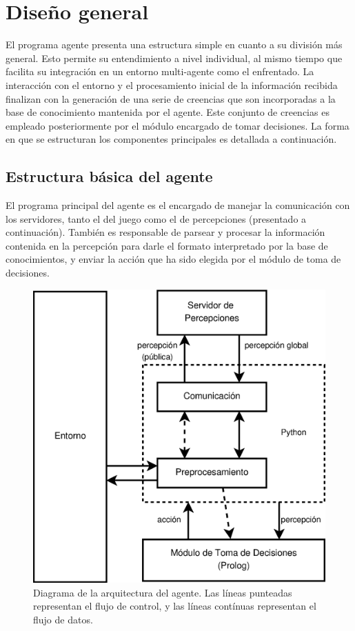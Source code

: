 \documentclass[oneside]{book}
\theoremstyle{definition}
\begin{document}
\section{Diseño general}

\label{sec:disenoGeneral}

El programa agente presenta una estructura simple en cuanto a su división más general. 
Esto permite su entendimiento a nivel individual, al mismo tiempo que facilita su 
integración en un entorno multi-agente como el enfrentado. La interacción con el entorno 
y el procesamiento inicial de la información recibida finalizan con la generación de una 
serie de creencias que son incorporadas a la base de conocimiento mantenida por el agente. 
Este conjunto de creencias es empleado posteriormente por el módulo encargado de tomar 
decisiones. La forma en que se estructuran los componentes principales es detallada a 
continuación.

\subsection{Estructura básica del agente}


El programa principal del agente es el encargado de manejar la comunicación con los 
servidores, tanto el del juego como el de percepciones (presentado 
a continuación). También es responsable de parsear y procesar la información contenida 
en la percepción para darle el formato interpretado por la base de conocimientos, y 
enviar la acción que ha sido elegida por el módulo de toma de decisiones.

\begin{figure}
 \centering
\includegraphics[scale=.5]{agent_architecture.eps}

 \caption{Diagrama de la arquitectura del agente. Las líneas punteadas representan el 
 flujo de control, y las líneas contínuas representan el flujo de datos.}
 \label{fig:architecture}
\end{figure}
\end{document}

